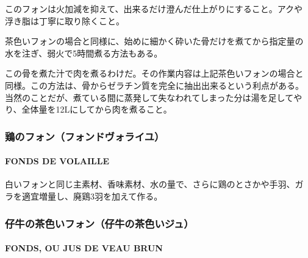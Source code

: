 \begin{recette}
このフォンは火加減を抑えて、出来るだけ澄んだ仕上がりにすること。アクや
浮き脂は丁寧に取り除くこと。

茶色いフォンの場合と同様に、始めに細かく砕いた骨だけを煮てから指定量の
水を注ぎ、弱火で5時間煮る方法もある。

この骨を煮た汁で肉を煮るわけだ。その作業内容は上記茶色いフォンの場合と
同様。この方法は、骨からゼラチン質を完全に抽出出来るという利点がある。
当然のことだが、煮ている間に蒸発して失なわれてしまった分は湯を足してや
り、全体量を12Lにしてから肉を煮ること。

\maeaki

\hypertarget{ux9d8fux306eux30d5ux30a9ux30f3ux30d5ux30a9ux30f3ux30c9ux30f4ux30a9ux30e9ux30a4ux30e6}{%
\subsubsection{鶏のフォン（フォンドヴォライユ）}\label{ux9d8fux306eux30d5ux30a9ux30f3ux30d5ux30a9ux30f3ux30c9ux30f4ux30a9ux30e9ux30a4ux30e6}}

\hypertarget{fonds-de-volaille}{%
\paragraph{FONDS DE VOLAILLE}\label{fonds-de-volaille}}


白いフォンと同じ主素材、香味素材、水の量で、さらに鶏のとさかや手羽、ガ
ラを適宜増量し、廃鶏3羽を加えて作る。

\maeaki

\hypertarget{ux4ed4ux725bux306eux8336ux8272ux3044ux30d5ux30a9ux30f3ux4ed4ux725bux306eux8336ux8272ux3044ux30b8ux30e5}{%
\subsubsection{仔牛の茶色いフォン（仔牛の茶色いジュ）}\label{ux4ed4ux725bux306eux8336ux8272ux3044ux30d5ux30a9ux30f3ux4ed4ux725bux306eux8336ux8272ux3044ux30b8ux30e5}}

\hypertarget{fonds-de-veau-brun}{%
\paragraph{FONDS, OU JUS DE VEAU BRUN}\label{fonds-de-veau-brun}}


\end{recette}
